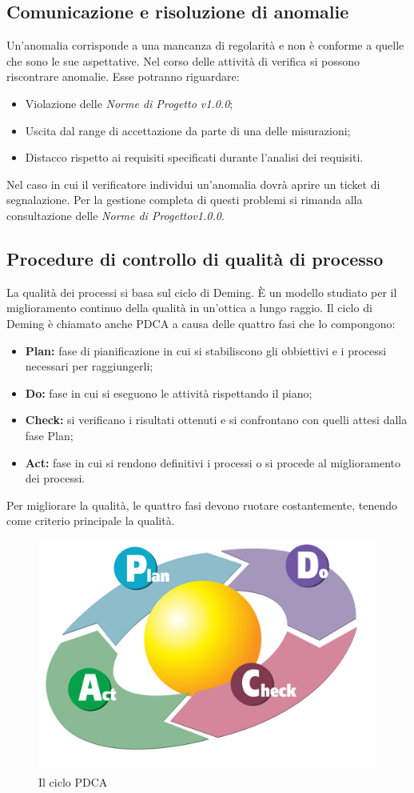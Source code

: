 \subsection{Comunicazione e risoluzione di anomalie}
Un'anomalia corrisponde a una mancanza di regolarità e non è conforme a quelle che sono le sue aspettative. Nel corso delle attività di verifica si possono riscontrare anomalie. Esse potranno riguardare:
\begin{itemize}
	\item Violazione delle \textit{Norme di Progetto v1.0.0};
	\item Uscita dal range di accettazione da parte di una delle misurazioni;
	\item Distacco rispetto ai requisiti specificati durante l'analisi dei requisiti.
\end{itemize}
Nel caso in cui il verificatore individui un'anomalia dovrà aprire un ticket di segnalazione. Per la gestione completa di questi problemi si rimanda alla consultazione delle \textit{Norme di Progettov1.0.0}.

\subsection{Procedure di controllo di qualità di processo}
La qualità dei processi si basa sul ciclo di Deming. È un modello studiato per il miglioramento continuo della qualità in un'ottica a lungo raggio.
Il ciclo di Deming è chiamato anche PDCA a causa delle quattro fasi che lo compongono:
\begin{itemize}
	\item \textbf{Plan:} fase di pianificazione in cui si stabiliscono gli obbiettivi e i processi necessari per raggiungerli;
	\item \textbf{Do:} fase in cui si eseguono le attività rispettando il piano;
	\item \textbf{Check:} si verificano i risultati ottenuti e si confrontano con quelli attesi dalla fase Plan;
	\item \textbf{Act:} fase in cui si rendono definitivi i processi o si procede al miglioramento dei processi. 
\end{itemize}
Per migliorare la qualità, le quattro fasi devono ruotare costantemente, tenendo come criterio principale la qualità.
\begin{figure}[h]
\centering
\includegraphics[width=0.7\linewidth]{img/PDCA_Cycle}
\caption[Il ciclo PDCA]{Il ciclo PDCA}
\label{fig:PDCA_Cycle}
\end{figure}

